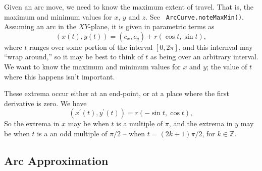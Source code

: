 \documentclass[titlepage,oneside,10pt]{article}
\begin{document}
Given an arc move, we need to know the maximum extent of travel. That
is, the maximum and minimum values for $x$, $y$ and $z$. See {\tt
  ArcCurve.noteMaxMin()}. Assuming an arc in the $XY$-plane, it is
given in parametric terms as 
$$(x(t),y(t)) = (c_x,c_y) + r(\cos t,\sin t),$$
where $t$ ranges over some portion of the interval $[0,2\pi]$, and
this internval may ``wrap around,'' so it may be best to think of $t$
as being over an arbitrary interval. We want to know the maximum and
minimum values for $x$ and $y$; the value of $t$ where this happens
isn't important.

These extrema occur either at an end-point, or at a place where the
first derivative is zero. We have
$$(x^\prime(t),y^\prime(t)) = r(-\sin t,\cos t),$$
So the extrema in $x$ may be when $t$ is a multiple of $\pi$, and the
extrema in $y$ may be when $t$ is a an odd multiple of $\pi/2$ -- when
$t = (2k+1)\pi/2$, for $k\in\mathbb{Z}$.

\subsection{Arc Approximation}
\end{document}
